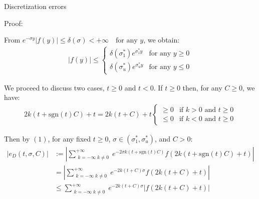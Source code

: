 \documentclass{beamer}
\begin{document}
\begin{frame}{Discretization errors}


    {\footnotesize \scriptsize
    \par Proof:
    \par From $ e^{-\sigma y} |f(y)| \leq \delta(\sigma) < +\infty \quad \text{for any } y$, we obtain:
    \begin{align*}
        |f(y)| \leq 
        \begin{cases} 
        \delta(\sigma_{1}^{*})e^{\sigma_{1}^{*}y} & \text{for any } y \geq 0 \\
        \delta(\sigma_{u}^{*})e^{\sigma_{u}^{*}y} & \text{for any } y \leq 0 \tag{1}
        \end{cases}
    \end{align*}
    \par We proceed to discuss two cases, \( t \geq 0 \) and \( t < 0 \). If \( t \geq 0 \) then, for any \( C \geq 0 \), we have:
    \begin{align*}
        2k(t + \text{sgn}(t)C) + t = 2k(t + C) + t 
        \begin{cases} 
        \geq 0 & \text{if } k > 0 \text{ and } t \geq 0 \\
        \leq 0 & \text{if } k < 0 \text{ and } t \geq 0
        \end{cases}
    \end{align*}
    \par \pause  Then by $(1)$, for any fixed \( t \geq 0 \), \( \sigma \in (\sigma_{1}^{*}, \sigma_{u}^{*}) \), and \( C > 0 \):
    \begin{align*}
          \left| e_D(t, \sigma, C) \right| & := \left| \sum_{\substack{k=-\infty \; k \neq 0}}^{+\infty} e^{-2\sigma k (t + \text{sgn}(t)C)} f(2k(t + \text{sgn}(t)C) + t)\right|\\
           & = \left| \sum_{\substack{k=-\infty \; k \neq 0}}^{+\infty}  e^{-2k(t+C)\sigma} f(2k(t + C) + t) \right|\\
           & \leq \sum_{\substack{k=-\infty \; k \neq 0}}^{+\infty}  e^{-2k(t+C)\sigma} |f(2k(t + C) + t)|
    \end{align*}
    
    }
    
\end{frame}
\end{document}
